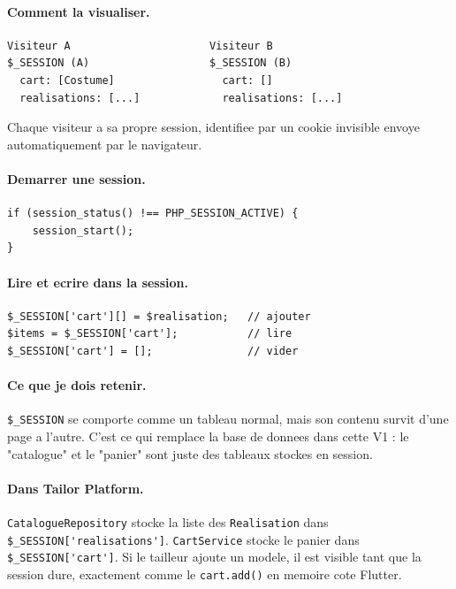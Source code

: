 \documentclass[11pt,a4paper]{article}
\begin{document}
\paragraph{Comment la visualiser.}

\begin{lstlisting}
Visiteur A                      Visiteur B
$_SESSION (A)                   $_SESSION (B)
  cart: [Costume]                 cart: []
  realisations: [...]             realisations: [...]
\end{lstlisting}

Chaque visiteur a sa propre session, identifiee par un cookie invisible
envoye automatiquement par le navigateur.

\paragraph{Demarrer une session.}

\begin{lstlisting}
if (session_status() !== PHP_SESSION_ACTIVE) {
    session_start();
}
\end{lstlisting}

\paragraph{Lire et ecrire dans la session.}

\begin{lstlisting}
$_SESSION['cart'][] = $realisation;   // ajouter
$items = $_SESSION['cart'];           // lire
$_SESSION['cart'] = [];               // vider
\end{lstlisting}

\paragraph{Ce que je dois retenir.}
\verb|$_SESSION| se comporte comme un tableau normal, mais son contenu
survit d'une page a l'autre. C'est ce qui remplace la base de donnees dans
cette V1 : le "catalogue" et le "panier" sont juste des tableaux stockes en
session.

\paragraph{Dans Tailor Platform.}
\verb|CatalogueRepository| stocke la liste des \verb|Realisation| dans
\verb|$_SESSION['realisations']|. \verb|CartService| stocke le panier dans
\verb|$_SESSION['cart']|. Si le tailleur ajoute un modele, il est visible
tant que la session dure, exactement comme le \verb|cart.add()| en memoire
cote Flutter.
\end{document}
